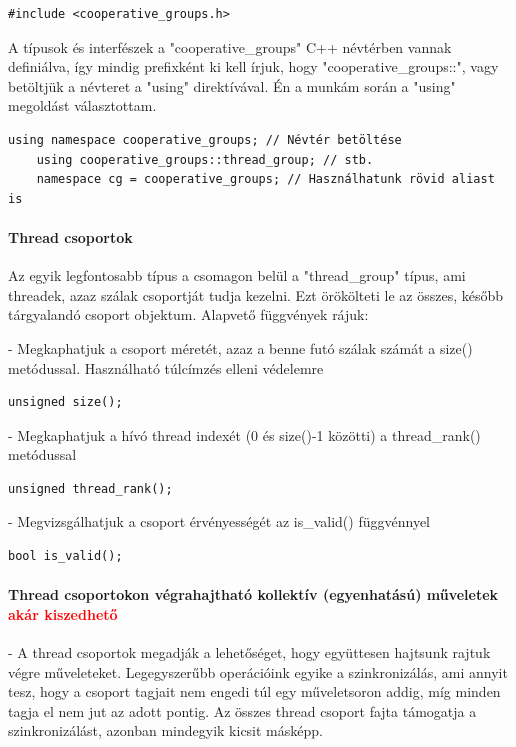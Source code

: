 \begin{lstlisting}[style=CStyle]
	#include <cooperative_groups.h>
\end{lstlisting}

A típusok és interfészek a "cooperative\_groups" C++ névtérben vannak definiálva, így mindig prefixként ki kell írjuk, hogy "cooperative\_groups::", vagy betöltjük a névteret a "using" direktívával. Én a munkám során a "using" megoldást választottam.

\begin{lstlisting}[style=CStyle]
	using namespace cooperative_groups; // Névtér betöltése
	using cooperative_groups::thread_group; // stb. 
	namespace cg = cooperative_groups; // Használhatunk rövid aliast is
\end{lstlisting}

\paragraph{Thread csoportok}
Az egyik legfontosabb típus a csomagon belül a "thread\_group" típus, ami threadek, azaz szálak csoportját tudja kezelni. Ezt örökölteti le az összes, később tárgyalandó csoport objektum. Alapvető függvények rájuk:

- Megkaphatjuk a csoport méretét, azaz a benne futó szálak számát a size() metódussal. Használható túlcímzés elleni védelemre
\begin{lstlisting}[style=CStyle]
	unsigned size();
\end{lstlisting}
- Megkaphatjuk a hívó thread indexét (0 és size()-1 közötti) a thread\_rank() metódussal
\begin{lstlisting}[style=CStyle]
	unsigned thread_rank();
\end{lstlisting}
- Megvizsgálhatjuk a csoport érvényességét az is\_valid() függvénnyel
\begin{lstlisting}[style=CStyle]
	bool is_valid();
\end{lstlisting}

\paragraph{Thread csoportokon végrahajtható kollektív (egyenhatású) műveletek \textcolor{red}{akár kiszedhető}} -
A thread csoportok megadják a lehetőséget, hogy együttesen hajtsunk rajtuk végre műveleteket. Legegyszerűbb operációink egyike a szinkronizálás, ami annyit tesz, hogy a csoport tagjait nem engedi túl egy műveletsoron addig, míg minden tagja el nem jut az adott pontig. Az összes thread csoport fajta támogatja a szinkronizálást, azonban mindegyik kicsit másképp.

